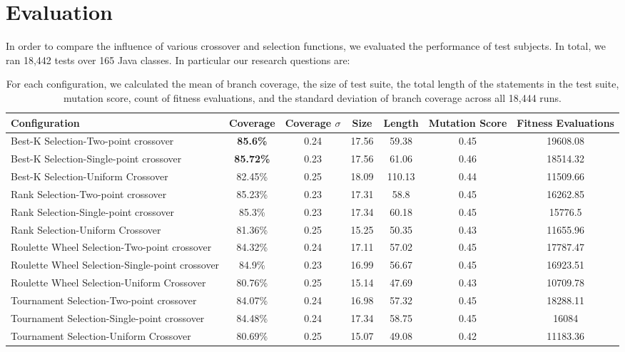 \documentclass[sigconf]{acmart}
\begin{document}
\section{Evaluation}
\label{evaluation}
In order to compare the influence of various crossover and selection functions, we evaluated the performance of 
test subjects. In total, we ran 18,442 tests over 165 Java classes. In particular our 
research questions are:
\begin{table}[h!t]
  \caption{For each configuration, we calculated the mean of branch coverage, the size of test suite, 
  the total length of the statements in the test suite, mutation score, count of fitness evaluations, 
  and the standard deviation of branch coverage across all 18,444 runs.}
  \label{tab:allresults}
  \begin{tabular}{lcccccc}
    \toprule
    Configuration&Coverage&Coverage $\sigma$ &Size&Length&Mutation Score&Fitness Evaluations\\
    \midrule
    Best-K Selection-Two-point crossover           &\textbf{85.6\%} & 0.24 & 17.56 & 59.38  &0.45 & 19608.08 \\
    Best-K Selection-Single-point crossover        &\textbf{85.72\%}& 0.23 & 17.56 & 61.06  &0.46 & 18514.32 \\
    Best-K Selection-Uniform Crossover             &82.45\%         & 0.25 & 18.09 & 110.13 &0.44 & 11509.66 \\
    \midrule
    Rank Selection-Two-point crossover             &85.23\%         & 0.23 & 17.31 & 58.8   &0.45 & 16262.85 \\
    Rank Selection-Single-point crossover          &85.3\%          & 0.23 & 17.34 & 60.18  &0.45 & 15776.5  \\
    Rank Selection-Uniform Crossover               &81.36\%         & 0.25 & 15.25 & 50.35  &0.43 & 11655.96 \\
    \midrule
    Roulette Wheel Selection-Two-point crossover   &84.32\%         & 0.24 & 17.11 & 57.02  &0.45 & 17787.47 \\
    Roulette Wheel Selection-Single-point crossover&84.9\%          & 0.23 & 16.99 & 56.67  &0.45 & 16923.51 \\
    Roulette Wheel Selection-Uniform Crossover     &80.76\%         & 0.25 & 15.14 & 47.69  &0.43 & 10709.78 \\
    \midrule
    Tournament Selection-Two-point crossover       &84.07\%         & 0.24 & 16.98 & 57.32  &0.45 & 18288.11 \\
    Tournament Selection-Single-point crossover    &84.48\%         & 0.24 & 17.34 & 58.75  &0.45 & 16084    \\
    Tournament Selection-Uniform Crossover         &80.69\%         & 0.25 & 15.07 & 49.08  &0.42 & 11183.36 \\
    \bottomrule
  \end{tabular}
\end{table}
\end{document}
